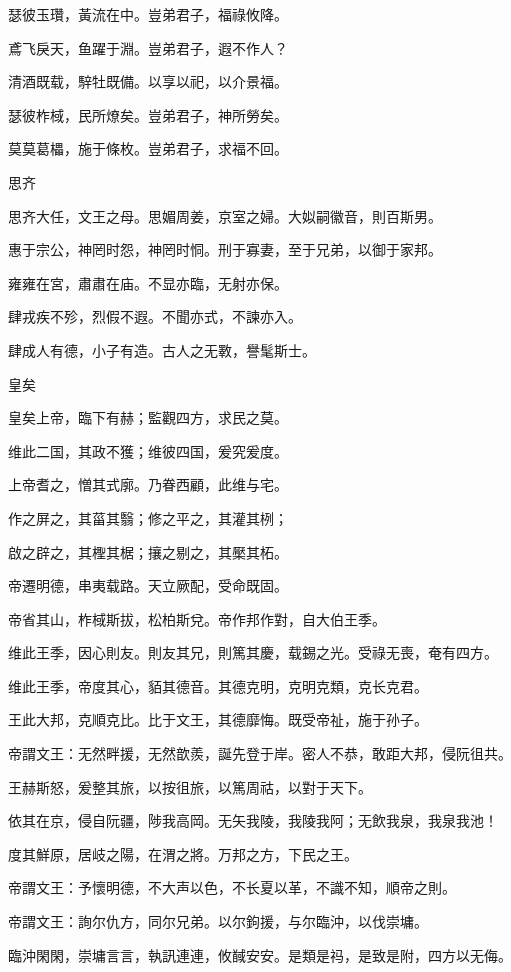 瑟彼玉瓚，黃流在中。豈弟君子，福祿攸降。

鳶飞戾天，鱼躍于淵。豈弟君子，遐不作人？

清酒既载，騂牡既備。以享以祀，以介景福。

瑟彼柞棫，民所燎矣。豈弟君子，神所勞矣。

莫莫葛櫑，施于條枚。豈弟君子，求福不回。

思齐

思齐大任，文王之母。思媚周姜，京室之婦。大姒嗣徽音，則百斯男。

惠于宗公，神罔时怨，神罔时恫。刑于寡妻，至于兄弟，以御于家邦。

雍雍在宮，肅肅在庙。不显亦臨，无射亦保。

肆戎疾不殄，烈假不遐。不聞亦式，不諫亦入。

肆成人有德，小子有造。古人之无斁，譽髦斯士。

皇矣

皇矣上帝，臨下有赫；監觀四方，求民之莫。

维此二国，其政不獲；维彼四国，爰究爰度。

上帝耆之，憎其式廓。乃眷西顧，此维与宅。

作之屏之，其菑其翳；修之平之，其灌其栵；

啟之辟之，其檉其椐；攘之剔之，其檿其柘。

帝遷明德，串夷载路。天立厥配，受命既固。

帝省其山，柞棫斯拔，松柏斯兌。帝作邦作對，自大伯王季。

维此王季，因心則友。則友其兄，則篤其慶，载錫之光。受祿无喪，奄有四方。

维此王季，帝度其心，貊其德音。其德克明，克明克類，克长克君。

王此大邦，克順克比。比于文王，其德靡悔。既受帝祉，施于孙子。

帝謂文王：无然畔援，无然歆羨，誕先登于岸。密人不恭，敢距大邦，侵阮徂共。

王赫斯怒，爰整其旅，以按徂旅，以篤周祜，以對于天下。

依其在京，侵自阮疆，陟我高岡。无矢我陵，我陵我阿；无飲我泉，我泉我池！

度其鮮原，居岐之陽，在渭之將。万邦之方，下民之王。

帝謂文王：予懷明德，不大声以色，不长夏以革，不識不知，順帝之則。

帝謂文王：詢尔仇方，同尔兄弟。以尔鉤援，与尔臨沖，以伐崇墉。

臨沖閑閑，崇墉言言，執訊連連，攸馘安安。是類是祃，是致是附，四方以无侮。

